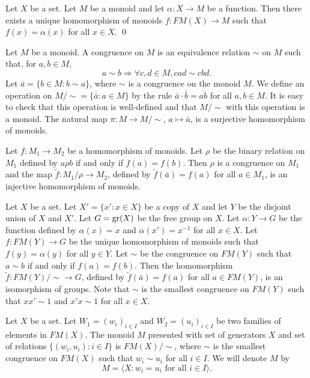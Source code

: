 \begin{proposition}
Let $X$ be a set. Let $M$ be a monoid and let $\alpha\colon X\rightarrow M$ be a function. Then there exists a unique homomorphism of monoids $f\colon FM(X)\rightarrow M$ such that $f(x)=\alpha(x)$ for all $x\in X$. \qed
\end{proposition}

Let $M$ be a monoid. A congruence on $M$ is an equivalence relation $\sim$ on $M$ such that, for $a,b\in M$,
\[ a\sim b\Rightarrow \forall c,d\in M, cad\sim cbd.\]
Let $\bar a=\{ b\in M : b\sim a\}$, where $\sim$ is a congruence on the monoid $M$. We define an operation on $M/\sim=\{ \bar a : a\in M\}$ by the rule $\bar a\cdot \bar b=\overline{ab}$ for all $a,b\in M$. It is easy to check that this operation is well-defined and that $M/\sim$ with this operation is a monoid. The natural map $\pi\colon M\rightarrow M/\sim$, $a\mapsto \bar a$, is a surjective homomorphism of monoids.

\begin{example}
Let $f\colon M_1\rightarrow M_2$ be a homomorphism of monoids. Let $\rho$ be the binary relation on $M_1$ defined by
$a\rho b$ if and only if $f(a)=f(b)$. Then $\rho$ is a congruence on $M_1$ and the map $\tilde f\colon M_1/\rho\rightarrow M_2$, defined by $\tilde f(\bar a)=f(a)$ for all $a\in M_1$, is an injective homomorphism of monoids.
\end{example}

\begin{example}
Let $X$ be a set. Let $X'=\{ x' : x\in X\}$ be a copy of $X$ and let $Y$ be the disjoint union of $X$ and $X'$. Let $G=\operatorname{gr}(X)$ be the free group on $X$. Let $\alpha\colon Y\rightarrow G$ be the function defined by $\alpha(x)=x$ and $\alpha(x')=x^{-1}$ for all $x\in X$. Let $f\colon FM(Y)\rightarrow G$ be the unique homomorphism of monoids such that $f(y)=\alpha(y)$ for all $y\in Y$. Let $\sim$ be the congruence on $FM(Y)$ such that $a\sim b$ if and only if $f(a)=f(b)$. Then the homomorphism $\tilde f\colon FM(Y)/\sim\rightarrow G$, defined by $\tilde f(\bar a)=f(a)$ for all $a\in FM(Y)$, is an isomorphism of groups. Note that $\sim$ is the smallest congruence on $FM(Y)$ such that $xx'\sim 1$ and $x'x\sim 1$ for all $x\in X$. 
\end{example}

Let $X$ be a set. Let $W_1=(w_i)_{i\in I}$ and $W_2=(u_i)_{i\in I}$ be two families of elements in $FM(X)$. The monoid $M$ presented with set of generators $X$ and set of relations $\{(w_i,u_i) : i\in I\}$ is $FM(X)/\sim$, where $\sim$ is the smallest congruence on $FM(X)$ such that $w_i\sim u_i$ for all $i\in I$. We will denote $M$ by
\[ M=\langle X : w_i=u_i\text{ for all }i\in I\rangle.\]

